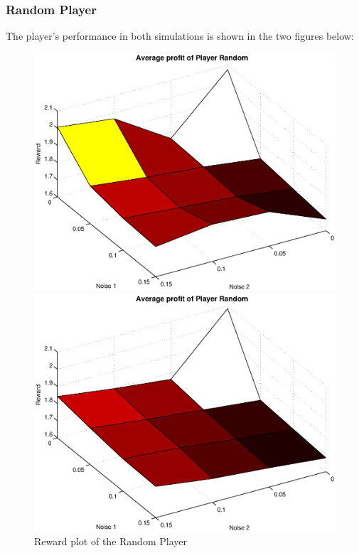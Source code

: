 \documentclass[11pt,twoside]{article}
\begin{document}
\subsubsection{Random Player}
The player's performance in both simulations is shown in the two figures below:
\begin{figure}[h]

\begin{minipage}[hbt]{0.65\textwidth}
	\centering
	\includegraphics[width=\textwidth]{pics/simulation1/Reward_vs_Noise_of_Player_Random}
\end{minipage}
\hfill
\begin{minipage}[hbt]{0.3\textwidth}
	\centering
	\includegraphics[width=\textwidth]{pics/simulation2/Reward_vs_Noise_of_Player_Random}
\end{minipage}
	\caption{Reward plot of the Random Player}
	\label{pic player random}
\end{figure}
\end{document}
